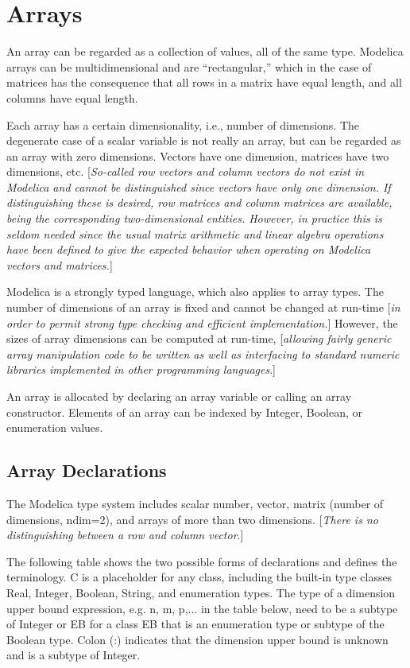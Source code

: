 \chapter{Arrays}

An array can be regarded as a collection of values, all of the same
type. Modelica arrays can be multidimensional and are ``rectangular,''
which in the case of matrices has the consequence that all rows in a
matrix have equal length, and all columns have equal length.

Each array has a certain dimensionality, i.e., number of dimensions. The
degenerate case of a scalar variable is not really an array, but can be
regarded as an array with zero dimensions. Vectors have one dimension,
matrices have two dimensions, etc. {[}\emph{So-called row vectors and
column vectors do not exist in Modelica and cannot be distinguished
since vectors have only one dimension. If distinguishing these is
desired, row matrices and column matrices are available, being the
corresponding two-dimensional entities. However, in practice this is
seldom needed since the usual matrix arithmetic and linear algebra
operations have been defined to give the expected behavior when
operating on Modelica vectors and matrices.}{]}

Modelica is a strongly typed language, which also applies to array
types. The number of dimensions of an array is fixed and cannot be
changed at run-time {[}\emph{in order to permit strong type checking and
efficient implementation.}{]} However, the sizes of array dimensions can
be computed at run-time, {[}\emph{allowing fairly generic array
manipulation code to be written as well as interfacing to standard
numeric libraries implemented in other programming languages}.{]}

An array is allocated by declaring an array variable or calling an array
constructor. Elements of an array can be indexed by Integer, Boolean, or
enumeration values.

\section{Array Declarations}

The Modelica type system includes scalar number, vector, matrix (number
of dimensions, ndim=2), and arrays of more than two dimensions.
{[}\emph{There is no distinguishing between a row and column vector}.{]}

The following table shows the two possible forms of declarations and
defines the terminology. C is a placeholder for any class, including the
built-in type classes Real, Integer, Boolean, String, and enumeration
types. The type of a dimension upper bound expression, e.g. n, m, p,...
in the table below, need to be a subtype of Integer or EB for a class EB
that is an enumeration type or subtype of the Boolean type. Colon (:)
indicates that the dimension upper bound is unknown and is a subtype of
Integer.


